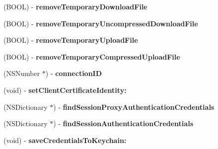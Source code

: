 \begin{DoxyCompactItemize}
\item 
\hypertarget{interface_a_s_i_h_t_t_p_request_a0e68fd4f22a1b5cdcfb3e63a3cdacde9}{
(\-B\-O\-O\-L) -\/ {\bfseries remove\-Temporary\-Download\-File}}
\label{interface_a_s_i_h_t_t_p_request_a0e68fd4f22a1b5cdcfb3e63a3cdacde9}

\item 
\hypertarget{interface_a_s_i_h_t_t_p_request_af8ef43877926d01b8a51abb62dd2e208}{
(\-B\-O\-O\-L) -\/ {\bfseries remove\-Temporary\-Uncompressed\-Download\-File}}
\label{interface_a_s_i_h_t_t_p_request_af8ef43877926d01b8a51abb62dd2e208}

\item 
\hypertarget{interface_a_s_i_h_t_t_p_request_aaf8e3adbbf00110b67232158921553c0}{
(\-B\-O\-O\-L) -\/ {\bfseries remove\-Temporary\-Upload\-File}}
\label{interface_a_s_i_h_t_t_p_request_aaf8e3adbbf00110b67232158921553c0}

\item 
\hypertarget{interface_a_s_i_h_t_t_p_request_a4f8b19d66be57ffad0d6128182c98414}{
(\-B\-O\-O\-L) -\/ {\bfseries remove\-Temporary\-Compressed\-Upload\-File}}
\label{interface_a_s_i_h_t_t_p_request_a4f8b19d66be57ffad0d6128182c98414}

\item 
\hypertarget{interface_a_s_i_h_t_t_p_request_a3e06c0a51784d32cc8198f616e63c530}{
(\-N\-S\-Number $\ast$) -\/ {\bfseries connection\-I\-D}}
\label{interface_a_s_i_h_t_t_p_request_a3e06c0a51784d32cc8198f616e63c530}

\item 
\hypertarget{interface_a_s_i_h_t_t_p_request_a4f24e48396e06b8a81de111e19c1314a}{
(void) -\/ {\bfseries set\-Client\-Certificate\-Identity\-:}}
\label{interface_a_s_i_h_t_t_p_request_a4f24e48396e06b8a81de111e19c1314a}

\item 
\hypertarget{interface_a_s_i_h_t_t_p_request_a480d62ba0d9ba8d1a64b25b45fb2d965}{
(\-N\-S\-Dictionary $\ast$) -\/ {\bfseries find\-Session\-Proxy\-Authentication\-Credentials}}
\label{interface_a_s_i_h_t_t_p_request_a480d62ba0d9ba8d1a64b25b45fb2d965}

\item 
\hypertarget{interface_a_s_i_h_t_t_p_request_a0f38ffc0ae199e83262895f640c9c263}{
(\-N\-S\-Dictionary $\ast$) -\/ {\bfseries find\-Session\-Authentication\-Credentials}}
\label{interface_a_s_i_h_t_t_p_request_a0f38ffc0ae199e83262895f640c9c263}

\item 
\hypertarget{interface_a_s_i_h_t_t_p_request_a3a57684f5aba49781ec3c9c9ef1516a6}{
(void) -\/ {\bfseries save\-Credentials\-To\-Keychain\-:}}
\label{interface_a_s_i_h_t_t_p_request_a3a57684f5aba49781ec3c9c9ef1516a6}


\end{DoxyCompactItemize}
